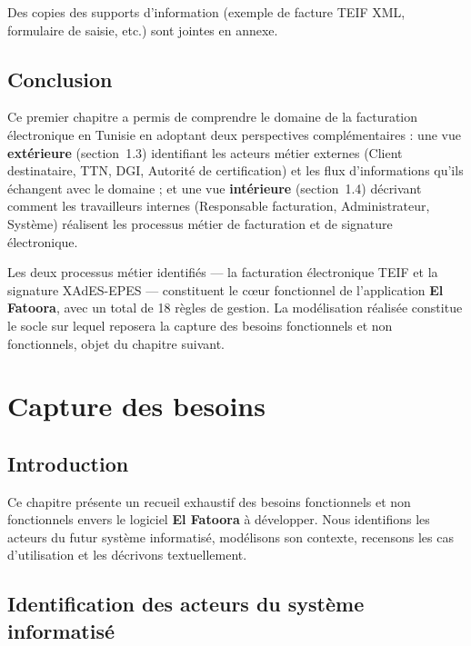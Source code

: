 \documentclass[a4paper,12pt]{report}
\newcommand{\elfattoora}{\textbf{El Fatoora}}
\begin{document}
Des copies des supports d'information (exemple de facture TEIF XML, formulaire de saisie, etc.) sont jointes en annexe.


\section{Conclusion}

Ce premier chapitre a permis de comprendre le domaine de la facturation électronique en Tunisie en adoptant deux perspectives complémentaires : une vue \textbf{extérieure} (section~1.3) identifiant les acteurs métier externes (Client destinataire, TTN, DGI, Autorité de certification) et les flux d'informations qu'ils échangent avec le domaine ; et une vue \textbf{intérieure} (section~1.4) décrivant comment les travailleurs internes (Responsable facturation, Administrateur, Système) réalisent les processus métier de facturation et de signature électronique.

Les deux processus métier identifiés — la facturation électronique TEIF et la signature XAdES-EPES — constituent le c\oe{}ur fonctionnel de l'application \elfattoora{}, avec un total de 18 règles de gestion. La modélisation réalisée constitue le socle sur lequel reposera la capture des besoins fonctionnels et non fonctionnels, objet du chapitre suivant.


\chapter{Capture des besoins}

\section{Introduction}

Ce chapitre présente un recueil exhaustif des besoins fonctionnels et non fonctionnels envers le logiciel \elfattoora{} à développer. Nous identifions les acteurs du futur système informatisé, modélisons son contexte, recensons les cas d'utilisation et les décrivons textuellement.

\section{Identification des acteurs du système informatisé}
\end{document}
